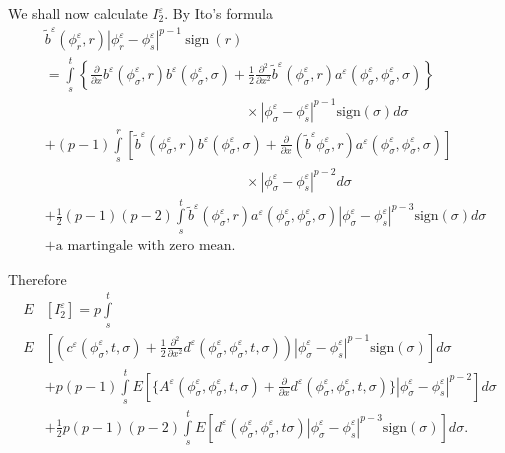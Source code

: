 We shall now calculate $I^{\varepsilon}_2$. By Ito's formula 
\begin{align*}
  &  \tilde{b}^{\varepsilon}(\phi^{\varepsilon}_r,r)|
  \phi^{\varepsilon}_r - \phi^{\varepsilon}_s|^{p-1}~\text{sign}~(r)\\  
  & = \int \limits^t_s \left\{ \frac{\partial}{\partial x}
  b^{\varepsilon}(\phi^{\varepsilon}_{\sigma},r) b^{\varepsilon}
  (\phi^{\varepsilon}_{\sigma},\sigma)  
  + \frac{1}{2} \frac{\partial^2}{\partial x^2} \tilde{b}^{\varepsilon}
  (\phi^{\varepsilon}_{\sigma},r) a^{\varepsilon}
  (\phi^{\varepsilon}_{\sigma}, \phi^{\varepsilon}_{\sigma},
  \sigma) \right\} \\
  & \hspace{6cm}\times |\phi^{\varepsilon}_{\sigma}
  -\phi^{\varepsilon}_{s} |^{p-1} \text{sign} (\sigma) d \sigma \\ 
  & + (p-1) \int\limits_{s}^{r} \left[\tilde{b}^{\varepsilon}
    (\phi^{\varepsilon}_{\sigma},r) b^{\varepsilon} (\phi
    ^{\varepsilon}_{\sigma}, \sigma ) + \frac{\partial}{\partial x}
    (\tilde{b}^{\varepsilon} \phi^{\varepsilon}_{\sigma},r)
    a^{\varepsilon} (\phi^{\varepsilon}_{\sigma},
    \phi^{\varepsilon}_{\sigma}, \sigma )\right]\\ 
  & \hspace{6cm}\times
  |\phi_{\sigma}^{\varepsilon} - \phi_{s}^{\varepsilon}|^{p-2} d
  \sigma\\ 
  & + \frac{1}{2}(p-1) (p-2) \int \limits^t_s
  \tilde{b}^{\varepsilon}(\phi^{\varepsilon}_{\sigma},r)
  a^{\varepsilon}(\phi^{\varepsilon}_{\sigma},\phi^{\varepsilon}_{\sigma},
  \sigma)|\phi^{\varepsilon}_{\sigma}-\phi^{\varepsilon}_s|^{p-3}
  \text{sign}(\sigma) d \sigma \\ 
  & + \text{a martingale with zero mean}. 
\tag{3.4.10}\label{c3:eq3.4.10}
\end{align*}

Therefore 
{\fontsize{10}{12}\selectfont
\begin{align*}
  E &\left[I^{\varepsilon}_2\right]  = p \int\limits^t_s\\ 
  E &\left[(c^{\varepsilon}(\phi^{\varepsilon}_{\sigma},t, \sigma)
    + \frac{1}{2} \frac{\partial^2}{\partial x^2}
    d^{\varepsilon}(\phi^{\varepsilon}_{\sigma},\phi^{\varepsilon}_{\sigma},
    t, \sigma))|\phi^{\varepsilon}_{\sigma}-\phi^{\varepsilon}_{s}|^{p-1}
     \text{sign}(\sigma)\right]d \sigma  \\
  & + p (p-1) \int\limits^t_sE[\{A^{\varepsilon}
    (\phi^{\varepsilon}_{\sigma},\phi^{\varepsilon}_{\sigma}, t,
    \sigma) + \frac{\partial}{\partial x} d^{\varepsilon}
    (\phi^{\varepsilon}_{\sigma}, \phi^{\varepsilon}_{\sigma}, t,
    \sigma)\} |\phi^{\varepsilon}_{\sigma} 
    -\phi^{\varepsilon}_{s}|^{p-2}]d \sigma \\
  & +\frac{1}{2} p(p-1)(p-2) 
  \int
  \limits^t_sE\left[d^{\varepsilon}(\phi^{\varepsilon}_{\sigma},
    \phi^{\varepsilon}_{\sigma}, t \sigma)|\phi^{\varepsilon}_{\sigma}
    -\phi^{\varepsilon}_{s}|^{p-3} \text{sign} (\sigma)\right]d \sigma. 
\end{align*}}\relax

